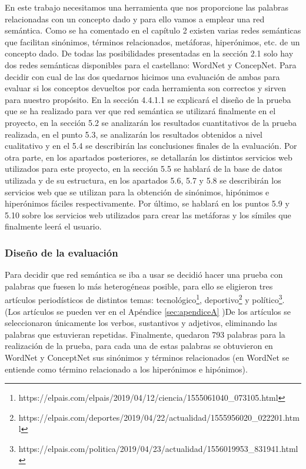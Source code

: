 En este trabajo necesitamos una herramienta que nos proporcione las palabras relacionadas con un concepto dado y para ello vamos a emplear una red semántica.
Como se ha comentado en el capítulo 2 existen varias redes semánticas que facilitan sinónimos, términos relacionados, metáforas, hiperónimos, etc. de un concepto dado. 
De todas las posibilidades presentadas en la sección 2.1 solo hay dos redes semánticas disponibles para el castellano: WordNet y ConcepNet. Para decidir con cual de las dos quedarnos hicimos una evaluación de ambas para evaluar si los conceptos devueltos por cada herramienta son correctos y sirven para nuestro propósito. En la sección 4.4.1.1 se explicará el diseño de la prueba que se ha realizado para ver que red semántica se utilizará finalmente en el proyecto, en la sección 5.2 se analizarán los resultados cuantitativos de la prueba realizada, en el punto 5.3, se analizarán los resultados obtenidos a nivel cualitativo y en el 5.4 se describirán las conclusiones finales de la evaluación. Por otra parte, en los apartados posteriores, se detallarán los distintos servicios web utilizados para este proyecto, en la sección 5.5 se hablará de la base de datos utilizada y de su estructura, en los apartados 5.6, 5.7 y 5.8 se describirán los servicios web que se utilizan para la obtención de sinónimos, hipónimos e hiperónimos fáciles respectivamente. Por último, se hablará en los puntos 5.9 y 5.10 sobre los servicios web utilizados para crear las metáforas y los símiles que finalmente leerá el usuario.


\subsubsection{Diseño de la evaluación}
\label{cap:subsec:disenioeval}


Para decidir que red semántica se iba a usar se decidió hacer una prueba con palabras que fuesen lo más heterogéneas posible, para ello se eligieron tres artículos periodísticos de distintos temas: tecnológico\footnote{https://elpais.com/elpais/2019/04/12/ciencia/1555061040\_073105.html}, deportivo\footnote{https://elpais.com/deportes/2019/04/22/actualidad/1555956020\_022201.html} y político\footnote{https://elpais.com/politica/2019/04/23/actualidad/1556019953\_831941.html}. (Los artículos se pueden ver en el Apéndice \ref{sec:apendiceA} )De los artículos se seleccionaron únicamente los verbos, sustantivos y adjetivos, eliminando las palabras que estuvieran repetidas. Finalmente, quedaron 793 palabras para la realización de la prueba, para cada una de estas palabras se obtuvieron en WordNet y ConceptNet sus sinónimos y términos relacionados (en WordNet se entiende como término relacionado a los hiperónimos e hipónimos).

